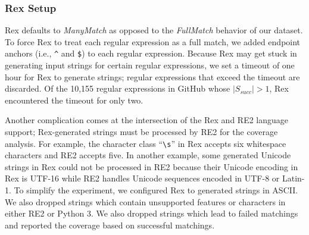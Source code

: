 




\subsubsection{Rex Setup}
Rex defaults 
to \emph{ManyMatch} as opposed to the \emph{FullMatch} behavior of our dataset. 
To force Rex to treat each regular expression as a full match, we added endpoint anchors (i.e., \verb!^! and \verb!$!) to each regular expression. 
Because Rex may get stuck in generating input strings for certain regular expressions, we set a timeout of one hour for Rex to generate strings; regular expressions that exceed the timeout are discarded. %
Of the 10,155 regular expressions in GitHub whose $\lvert S_{succ} \rvert >1$, Rex encountered the timeout for only two. %
 
 Another complication comes at the intersection of the Rex and RE2 language support; Rex-generated strings must be processed by RE2 for the coverage analysis. 
For example, the character class ``\verb!\s!'' in Rex accepts six whitespace characters and RE2 accepts five.  In another example, some generated Unicode strings in Rex could not be processed in RE2 because their Unicode encoding in Rex is UTF-16 while RE2 handles Unicode sequences encoded in UTF-8 or Latin-1. 
To simplify the experiment, we configured Rex to generated strings in ASCII. We also dropped strings which contain unsupported features or characters in either RE2 or Python 3. We also dropped strings which lead to failed matchings and reported the coverage based on successful matchings.

